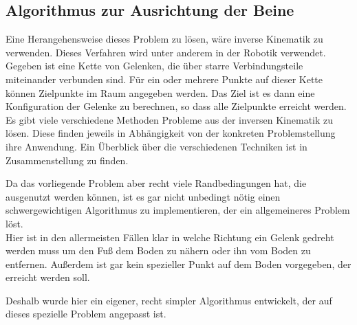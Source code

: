 \subsection{Algorithmus zur Ausrichtung der Beine}
\label{leg_algo}

Eine Herangehensweise dieses Problem zu lösen, wäre inverse Kinematik zu verwenden. Dieses Verfahren wird unter anderem in der Robotik verwendet. Gegeben ist eine Kette von Gelenken, die über starre Verbindungsteile miteinander verbunden sind. Für ein oder mehrere Punkte auf dieser Kette können Zielpunkte im Raum angegeben werden. Das Ziel ist es dann eine Konfiguration der Gelenke zu berechnen, so dass alle Zielpunkte erreicht werden.\\
Es gibt viele verschiedene Methoden Probleme aus der inversen Kinematik zu lösen. Diese finden jeweils in Abhängigkeit von der konkreten Problemstellung ihre Anwendung. Ein Überblick über die verschiedenen Techniken ist in Zusammenstellung \cite{IKSurvey} zu finden.

Da das vorliegende Problem aber recht viele Randbedingungen hat, die ausgenutzt werden können, ist es gar nicht unbedingt nötig einen schwergewichtigen Algorithmus zu implementieren, der ein allgemeineres Problem löst.\\
Hier ist \zb in den allermeisten Fällen klar in welche Richtung ein Gelenk gedreht werden muss um den Fuß dem Boden zu nähern oder ihn vom Boden zu entfernen. Außerdem ist gar kein spezieller Punkt auf dem Boden vorgegeben, der erreicht werden soll.

Deshalb wurde hier ein eigener, recht simpler Algorithmus entwickelt, der auf dieses spezielle Problem angepasst ist.


%  
% 

